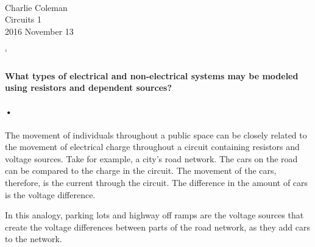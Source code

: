 \documentclass[letterpaper,12pt,titlepage]{article}
\begin{document}
\begin{center}
\\
Charlie Coleman\\
Circuits 1\\
2016 November 13
\end{center}
`
\paragraph{What types of electrical and non-electrical systems may be modeled using resistors and dependent sources?}
\paragraph{•}
The movement of individuals throughout a public space can be closely related to the movement of electrical charge throughout a circuit containing resistors and voltage sources. Take for example, a city's road network. The cars on the road can be compared to the charge in the circuit. The movement of the cars, therefore, is the current through the circuit. The difference in the amount of cars is the voltage difference. 

In this analogy, parking lots and highway off ramps are the voltage sources that create the voltage differences between parts of the road network, as they add cars to the network.
\end{document}
